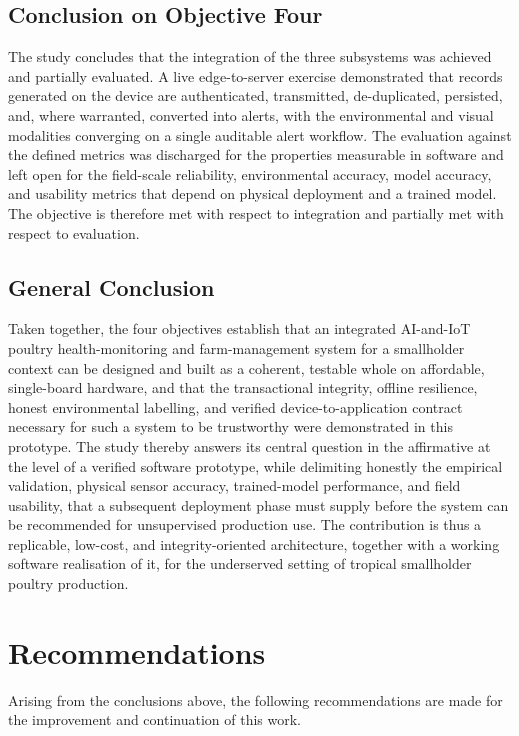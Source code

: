 \documentclass[12pt,a4paper]{report}
\begin{document}
\subsection{Conclusion on Objective Four}

The study concludes that the integration of the three subsystems was achieved and partially evaluated. A live edge-to-server exercise demonstrated that records generated on the device are authenticated, transmitted, de-duplicated, persisted, and, where warranted, converted into alerts, with the environmental and visual modalities converging on a single auditable alert workflow. The evaluation against the defined metrics was discharged for the properties measurable in software and left open for the field-scale reliability, environmental accuracy, model accuracy, and usability metrics that depend on physical deployment and a trained model. The objective is therefore met with respect to integration and partially met with respect to evaluation.

\subsection{General Conclusion}

Taken together, the four objectives establish that an integrated AI-and-IoT poultry health-monitoring and farm-management system for a smallholder context can be designed and built as a coherent, testable whole on affordable, single-board hardware, and that the transactional integrity, offline resilience, honest environmental labelling, and verified device-to-application contract necessary for such a system to be trustworthy were demonstrated in this prototype. The study thereby answers its central question in the affirmative at the level of a verified software prototype, while delimiting honestly the empirical validation, physical sensor accuracy, trained-model performance, and field usability, that a subsequent deployment phase must supply before the system can be recommended for unsupervised production use. The contribution is thus a replicable, low-cost, and integrity-oriented architecture, together with a working software realisation of it, for the underserved setting of tropical smallholder poultry production.

\section{Recommendations}

Arising from the conclusions above, the following recommendations are made for the improvement and continuation of this work.
\end{document}
